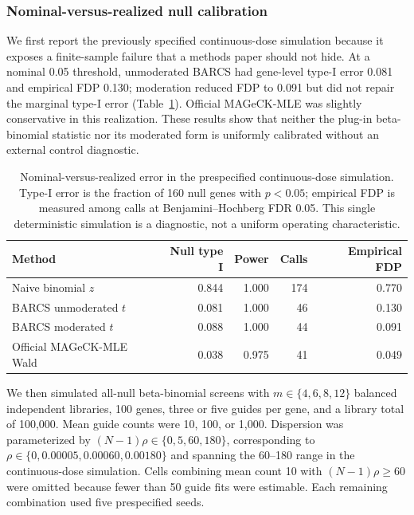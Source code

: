 \subsubsection{Nominal-versus-realized null calibration}
\label{sec:supp-calibration}

We first report the previously specified continuous-dose simulation because it
exposes a finite-sample failure that a methods paper should not hide.  At a
nominal 0.05 threshold, unmoderated BARCS had gene-level type-I error 0.081
and empirical FDP 0.130; moderation reduced FDP to 0.091 but did not repair
the marginal type-I error (Table~\ref{tab:calibration-diagnostic}).  Official
MAGeCK-MLE was slightly conservative in this realization.  These results show
that neither the plug-in beta-binomial statistic nor its moderated form is
uniformly calibrated without an external control diagnostic.

\begin{table}[htbp]
\centering
\caption{Nominal-versus-realized error in the prespecified continuous-dose
simulation.  Type-I error is the fraction of 160 null genes with $p<0.05$;
empirical FDP is measured among calls at Benjamini--Hochberg FDR 0.05.  This
single deterministic simulation is a diagnostic, not a uniform operating
characteristic.}
\label{tab:calibration-diagnostic}
\small
\begin{tabular}{lrrrr}
\toprule
Method & Null type I & Power & Calls & Empirical FDP\\
\midrule
Naive binomial $z$ & 0.844 & 1.000 & 174 & 0.770\\
BARCS unmoderated $t$ & 0.081 & 1.000 & 46 & 0.130\\
BARCS moderated $t$ & 0.088 & 1.000 & 44 & 0.091\\
Official MAGeCK-MLE Wald & 0.038 & 0.975 & 41 & 0.049\\
\bottomrule
\end{tabular}
\end{table}

We then simulated all-null beta-binomial screens with $m\in\{4,6,8,12\}$
balanced independent libraries, 100 genes, three or five guides per gene, and
a library total of 100,000.  Mean guide counts were 10, 100, or 1,000.
Dispersion was parameterized by $(N-1)\rho\in\{0,5,60,180\}$, corresponding
to $\rho\in\{0,0.00005,0.00060,0.00180\}$ and spanning the 60--180 range in
the continuous-dose simulation.  Cells combining mean count 10 with
$(N-1)\rho\geq60$ were omitted because fewer than 50 guide fits were
estimable.  Each remaining combination used five prespecified seeds.

